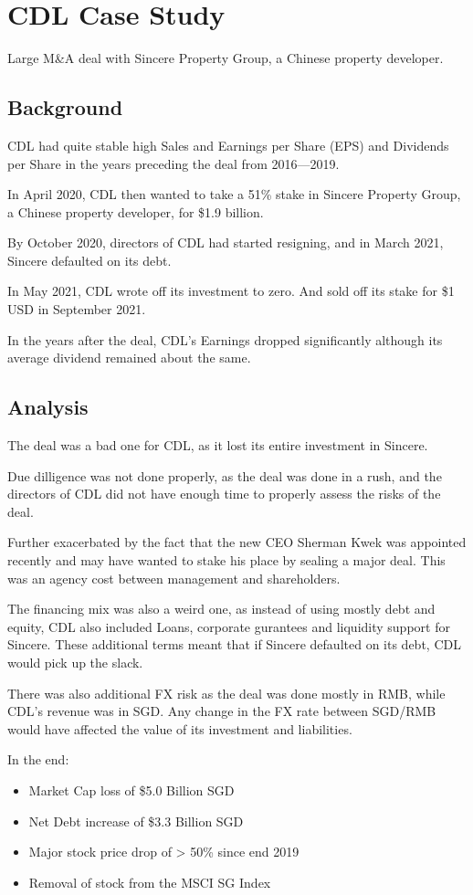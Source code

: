 \section{CDL Case Study}
Large M\&A deal with Sincere Property Group, a Chinese property developer.

\subsection{Background}
CDL had quite stable high Sales and Earnings per Share (EPS) and Dividends per Share in the years preceding the deal from 2016---2019.

In April 2020, CDL then wanted to take a 51\% stake in Sincere Property Group, a Chinese property developer, for \$1.9 billion.

By October 2020, directors of CDL had started resigning, and in March 2021, Sincere defaulted on its debt.

In May 2021, CDL wrote off its investment to zero. And sold off its stake for \$1 USD in September 2021.

In the years after the deal, CDL's Earnings dropped significantly although its average dividend remained about the same.

\subsection{Analysis}
The deal was a bad one for CDL, as it lost its entire investment in Sincere.

Due dilligence was not done properly, as the deal was done in a rush, and the directors of CDL did not have enough time to properly assess the risks of the deal.

Further exacerbated by the fact that the new CEO Sherman Kwek was appointed recently and may have wanted to stake his place by sealing a major deal. This was an agency cost between management and shareholders.

The financing mix was also a weird one, as instead of using mostly debt and equity, CDL also included Loans, corporate gurantees and liquidity support for Sincere. These additional terms meant that if Sincere defaulted on its debt, CDL would pick up the slack.

There was also additional FX risk as the deal was done mostly in RMB, while CDL's revenue was in SGD. Any change in the FX rate between SGD/RMB would have affected the value of its investment and liabilities.

In the end:
\begin{itemize}
    \item Market Cap loss of \$5.0 Billion SGD
    \item Net Debt increase of \$3.3 Billion SGD
    \item Major stock price drop of > 50\% since end 2019
    \item Removal of stock from the MSCI SG Index
\end{itemize}

